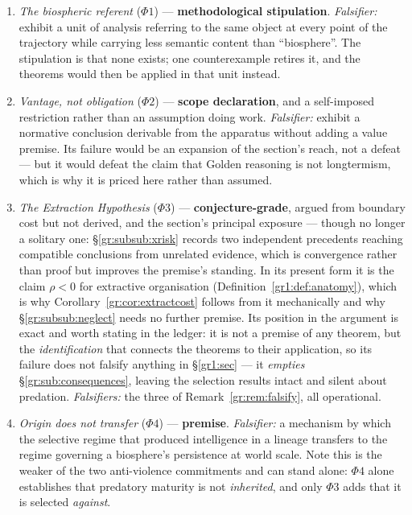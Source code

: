 \documentclass[11pt]{article}
\numberwithin{equation}{section}
\theoremstyle{plain}
\theoremstyle{definition}
\theoremstyle{remark}
\begin{document}
\begin{enumerate}[itemsep=2pt]
\item \emph{The biospheric referent} ($\Phi1$) ---
\textbf{methodological stipulation}. \emph{Falsifier:} exhibit a unit of
analysis referring to the same object at every point of the trajectory
while carrying less semantic content than ``biosphere''. The stipulation
is that none exists; one counterexample retires it, and the theorems
would then be applied in that unit instead.

\item \emph{Vantage, not obligation} ($\Phi2$) --- \textbf{scope
declaration}, and a self-imposed restriction rather than an assumption
doing work. \emph{Falsifier:} exhibit a normative conclusion derivable
from the apparatus without adding a value premise. Its failure would be
an expansion of the section's reach, not a defeat --- but it would
defeat the claim that Golden reasoning is not longtermism, which is why
it is priced here rather than assumed.

\item \emph{The Extraction Hypothesis} ($\Phi3$) ---
\textbf{conjecture-grade}, argued from boundary cost but not derived,
and the section's principal exposure --- though no longer a solitary
one: \S\ref{gr:subsub:xrisk} records two independent precedents
\cite{Tainter88,Bostrom19} reaching compatible conclusions from
unrelated evidence, which is convergence rather than proof but improves
the premise's standing. In its present form it is the
claim $\rho<0$ for extractive organisation
(Definition~\ref{gr1:def:anatomy}), which is why
Corollary~\ref{gr:cor:extractcost} follows from it mechanically and why
\S\ref{gr:subsub:neglect} needs no further premise. Its position in the argument is
exact and worth stating in the ledger: it is not a premise of any
theorem, but the \emph{identification} that connects the theorems to
their application, so its failure does not falsify anything in
\S\ref{gr1:sec} --- it \emph{empties}
\S\ref{gr:sub:consequences}, leaving the selection results intact and
silent about predation. \emph{Falsifiers:} the three of
Remark~\ref{gr:rem:falsify}, all operational.

\item \emph{Origin does not transfer} ($\Phi4$) --- \textbf{premise}.
\emph{Falsifier:} a mechanism by which the selective regime that
produced intelligence in a lineage transfers to the regime governing a
biosphere's persistence at world scale. Note this is the weaker of the
two anti-violence commitments and can stand alone: $\Phi4$ alone
establishes that predatory maturity is not \emph{inherited}, and only
$\Phi3$ adds that it is selected \emph{against}.


\end{enumerate}
\end{document}
